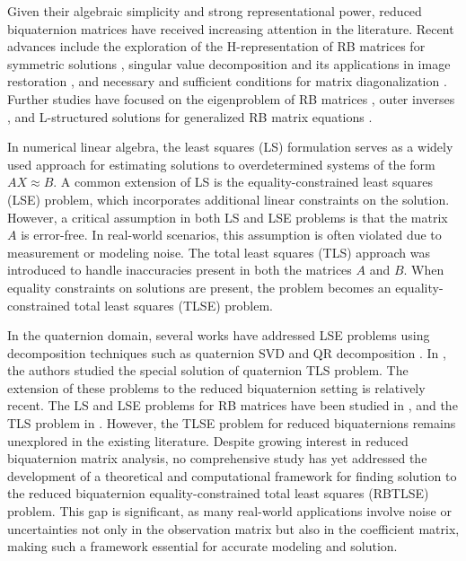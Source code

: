 \documentclass[preprint,11pt,3p]{elsarticle}
\begin{document}
Given their algebraic simplicity and strong representational power, reduced biquaternion matrices have received increasing attention in the literature. Recent advances include the exploration of the H-representation of RB matrices for symmetric solutions \cite{han2025h}, singular value decomposition and its applications in image restoration \cite{MR4839554}, and necessary and sufficient conditions for matrix diagonalization \cite{MR4685147}. Further studies have focused on the eigenproblem of RB matrices \cite{MR4649293}, outer inverses \cite{bhadala2024outer}, and L-structured solutions for generalized RB matrix equations \cite{ahmad2025structure}.

In numerical linear algebra, the least squares (LS) formulation serves as a widely used approach for estimating solutions to overdetermined systems of the form $AX \approx B$. A common extension of LS is the equality-constrained least squares (LSE) problem, which incorporates additional linear constraints on the solution. However, a critical assumption in both LS and LSE problems is that the matrix $A$ is error-free. In real-world scenarios, this assumption is often violated due to measurement or modeling noise. The total least squares (TLS) approach was introduced to handle inaccuracies present in both the matrices $A$ and $B$. When equality constraints on solutions are present, the problem becomes an equality-constrained total least squares (TLSE) problem.

In the quaternion domain, several works have addressed LSE problems using decomposition techniques such as quaternion SVD \cite{MR4287902} and QR decomposition \cite{MR4509107}. In \cite{MR3416387}, the authors studied the special solution of quaternion TLS problem. The extension of these problems to the reduced biquaternion setting is relatively recent. The LS and LSE problems for RB matrices have been studied in \cite{ahmad2024solutions, MR4085494, MR4532609}, and the TLS problem in \cite{MR4848406}. However, the TLSE problem for reduced biquaternions remains unexplored in the existing literature. Despite growing interest in reduced biquaternion matrix analysis, no comprehensive study has yet addressed the development of a theoretical and computational framework for finding solution to the reduced biquaternion equality-constrained total least squares (RBTLSE) problem. This gap is significant, as many real-world applications involve noise or uncertainties not only in the observation matrix but also in the coefficient matrix, making such a framework essential for accurate modeling and solution.
\end{document}
